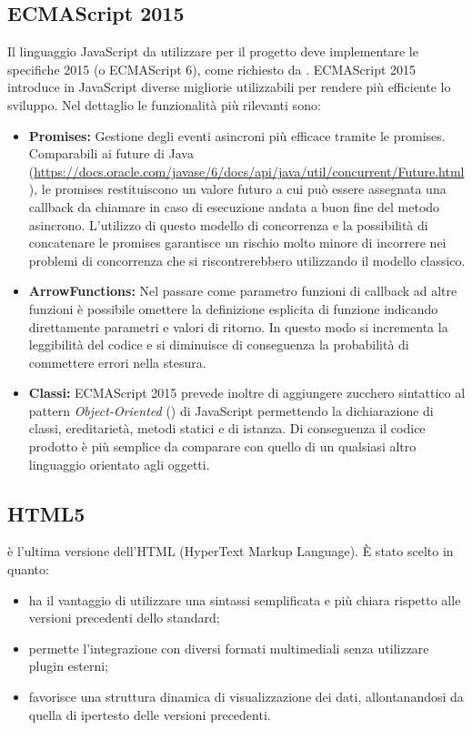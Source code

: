 \subsection{ECMAScript 2015}
Il linguaggio JavaScript da utilizzare per il progetto deve implementare le specifiche  2015 (o ECMAScript 6), come richiesto da \Proponente. ECMAScript 2015 introduce in JavaScript diverse migliorie utilizzabili per rendere più efficiente lo sviluppo. Nel dettaglio le funzionalità più rilevanti sono:
\begin{itemize}
	\item \textbf{Promises:} Gestione degli eventi asincroni più efficace tramite le promises. Comparabili ai future di Java (\url{https://docs.oracle.com/javase/6/docs/api/java/util/concurrent/Future.html}), le promises restituiscono un valore futuro a cui può essere assegnata una callback da chiamare in caso di esecuzione andata a buon fine del metodo asincrono. L'utilizzo di questo modello di concorrenza e la possibilità di concatenare le promises garantisce un rischio molto minore di incorrere nei problemi di concorrenza che si riscontrerebbero utilizzando il modello classico.
	\item \textbf{ArrowFunctions:} Nel passare come parametro funzioni di callback ad altre funzioni è possibile omettere la definizione esplicita di funzione indicando direttamente parametri e valori di ritorno. In questo modo si incrementa la leggibilità del codice e si diminuisce di conseguenza la probabilità di commettere errori nella stesura.
	\item \textbf{Classi:} ECMAScript 2015 prevede inoltre di aggiungere zucchero sintattico al pattern \textit{Object-Oriented} () di JavaScript permettendo la dichiarazione di classi, ereditarietà, metodi statici e di istanza. Di conseguenza il codice prodotto è più semplice da comparare con quello di un qualsiasi altro linguaggio orientato agli oggetti.
\end{itemize}

\subsection{HTML5}
 è l'ultima versione dell'HTML (HyperText Markup Language). È stato scelto in quanto:
\begin{itemize}
	\item ha il vantaggio di utilizzare una sintassi semplificata e più chiara rispetto alle versioni precedenti dello standard;
	\item permette l'integrazione con diversi formati multimediali senza utilizzare plugin esterni; 
	\item favorisce una struttura dinamica di visualizzazione dei dati, allontanandosi da quella di ipertesto delle versioni precedenti.
\end{itemize}

